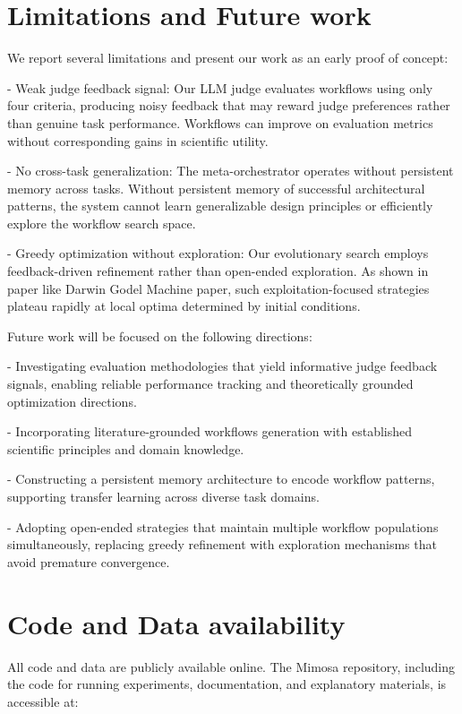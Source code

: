 \documentclass{article}
\begin{document}
\section{Limitations and Future work}

We report several limitations and present our work as an early proof of concept:

- Weak judge feedback signal: Our LLM judge evaluates workflows using only four criteria, producing noisy feedback that may reward judge preferences rather than genuine task performance. Workflows can improve on evaluation metrics without corresponding gains in scientific utility.

- No cross-task generalization: The meta-orchestrator operates without persistent memory across tasks. Without persistent memory of successful architectural patterns, the system cannot learn generalizable design principles or efficiently explore the workflow search space.

- Greedy optimization without exploration: Our evolutionary search employs feedback-driven refinement rather than open-ended exploration. As shown in paper like Darwin Godel Machine paper, such exploitation-focused strategies plateau rapidly at local optima determined by initial conditions.

Future work will be focused on the following directions:

- Investigating evaluation methodologies that yield informative judge feedback signals, enabling reliable performance tracking and theoretically grounded optimization directions.

- Incorporating literature-grounded workflows generation with established scientific principles and domain knowledge.

- Constructing a persistent memory architecture to encode workflow patterns, supporting transfer learning across diverse task domains.

- Adopting open-ended strategies that maintain multiple workflow populations simultaneously, replacing greedy refinement with exploration mechanisms that avoid premature convergence.

\section{Code and Data availability}

All code and data are publicly available online. The Mimosa repository, including the code for running experiments, documentation, and explanatory materials, is accessible at:
\end{document}
